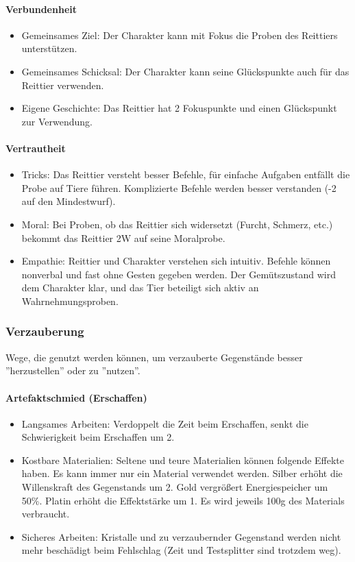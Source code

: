 \documentclass{article}
\begin{document}
\paragraph{Verbundenheit}

\begin{itemize}
\item Gemeinsames Ziel: Der Charakter kann mit Fokus die Proben des Reittiers unterstützen.
\item Gemeinsames Schicksal: Der Charakter kann seine Glückspunkte auch für das Reittier verwenden.
\item Eigene Geschichte: Das Reittier hat 2 Fokuspunkte und einen Glückspunkt zur Verwendung.
\end{itemize}

\paragraph{Vertrautheit}

\begin{itemize}
\item Tricks: Das Reittier versteht besser Befehle, für einfache Aufgaben entfällt die Probe auf Tiere führen. Komplizierte Befehle werden besser verstanden (-2 auf den Mindestwurf).
\item Moral: Bei Proben, ob das Reittier sich widersetzt (Furcht, Schmerz, etc.) bekommt das Reittier 2W auf seine Moralprobe.
\item Empathie: Reittier und Charakter verstehen sich intuitiv. Befehle können nonverbal und fast ohne Gesten gegeben werden. Der Gemütszustand wird dem Charakter klar, und das Tier beteiligt sich aktiv an Wahrnehmungsproben.
\end{itemize}

\subsubsection{Verzauberung}

Wege, die genutzt werden können, um verzauberte Gegenstände besser ''herzustellen'' oder zu ''nutzen''.

\paragraph{Artefaktschmied (Erschaffen)}

\begin{itemize}
\item Langsames Arbeiten: Verdoppelt die Zeit beim Erschaffen, senkt die Schwierigkeit beim Erschaffen um 2.
\item Kostbare Materialien: Seltene und teure Materialien können folgende Effekte haben. Es kann immer nur ein Material verwendet werden. Silber erhöht die Willenskraft des Gegenstands um 2. Gold vergrößert Energiespeicher um 50\%. Platin erhöht die Effektstärke um 1. Es wird jeweils 100g des Materials verbraucht.
\item Sicheres Arbeiten: Kristalle und zu verzaubernder Gegenstand werden nicht mehr beschädigt beim Fehlschlag (Zeit und Testsplitter sind trotzdem weg).
\end{itemize}
\end{document}
